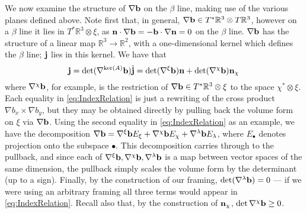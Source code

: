 We now examine the structure of $\nabla \mathbf{b}$ on the $\beta$ line, making use of the various planes defined above. Note first that, in general, $\nabla \mathbf{b} \in T^*\mathbb{R}^3 \otimes T\mathbb{R}^3$, however on a $\beta$ line it lies in $T^*\mathbb{R}^3 \otimes \xi$, as $\mathbf{n} \cdot \nabla \mathbf{b} = - \mathbf{b} \cdot \nabla \mathbf{n} = 0$ on the $\beta$ line.  $\nabla \mathbf{b}$ has the structure of a linear map $\mathbb{R}^3 \rightarrow \mathbb{R}^2$, with a one-dimensional kernel  which defines the $\beta$ line; $\mathbf{j}$ lies in this kernel. We have that 
\begin{equation}
\mathbf{j} = \mathrm{det}(\nabla^{\ker(A)}\mathbf{b}) \hat{\mathbf{j}} = \mathrm{det}(\nabla^\xi \mathbf{b}) \mathbf{n} + \mathrm{det}(\nabla^\chi \mathbf{b}) \mathbf{n}_\chi
\label{eq:IndexRelation}
\end{equation}
where $\nabla^\chi \mathbf{b}$, for example, is the restriction of $\nabla \mathbf{b} \in T^*\mathbb{R}^3 \otimes \xi $ to the space $\chi^* \otimes \xi$. Each equality in \eqref{eq:IndexRelation} is just a rewriting of the cross product $\nabla b_x \times \nabla b_y$, but they may be obtained directly by pulling back the volume form on $\xi$ via $\nabla \mathbf{b}$. Using the second equality  in \eqref{eq:IndexRelation} as an example, we have the decomposition $\nabla \mathbf{b} = \nabla^\xi \mathbf{b} E_\xi + \nabla^\chi \mathbf{b} E_\chi+ \nabla^\lambda \mathbf{b} E_\lambda$, where $E_\bullet$ denotes projection onto the subspace $\bullet$. This decomposition carries through to the pullback, and since each of $\nabla^\xi \mathbf{b} , \nabla^\chi \mathbf{b},\nabla^\lambda \mathbf{b} $ is a map between vector spaces of the same dimension, the pullback simply scales the volume form by the determinant (up to a sign). Finally, by the construction of our framing, $\mathrm{det}(\nabla^\lambda \mathbf{b}) =0$ --- if we were using an arbitrary framing all three terms would appear in \eqref{eq:IndexRelation}. Recall also that, by the construction of $\mathbf{n}_\chi$, $\det\nabla^\chi \mathbf{b} \geq 0$.

